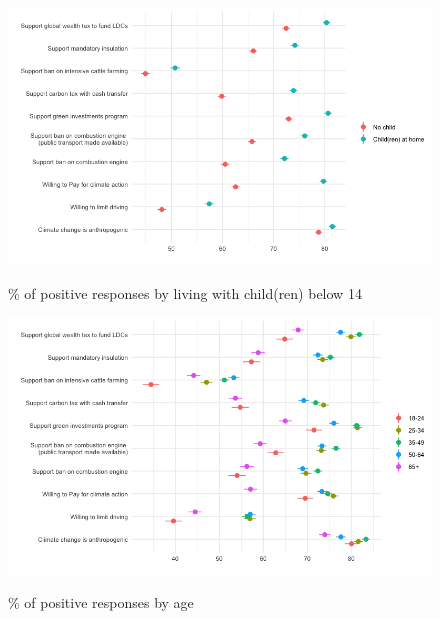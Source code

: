 	\begin{frame}{}%
	\begin{figure}[h!]
	\caption{\% of positive responses by living with child(ren) below 14}
	\includegraphics[width=.7\paperwidth]{../figures/country_comparison/main_var_by_country_children_all.png} \\
	\end{figure}
	\end{frame}
	
	\begin{frame}{}%
	\begin{figure}[h!]
	\caption{\% of positive responses by age}
	\includegraphics[width=.7\paperwidth]{../figures/country_comparison/main_var_by_country_age_all.png} \\
	\end{figure}
	\end{frame}
	
